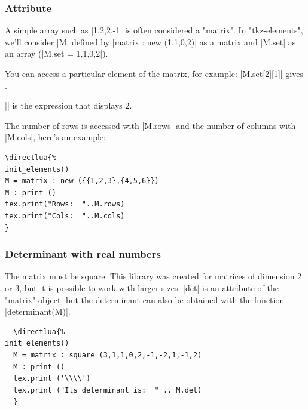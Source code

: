 \subsubsection{Attribute } %
\label{sub:attribute_set}
A simple array such as |{{1,2},{2,-1}}| is often considered a "matrix". In "tkz-elements", we'll consider |M| defined by |matrix : new ({{1,1},{0,2}})| as a matrix and |M.set| as an array (|M.set = {{1,1},{0,2}}|).

You can access a particular element of the matrix, for example: |M.set[2][1]| gives . 

|| is the expression that displays $2$.

The number of rows is accessed with |M.rows| and the number of columns with |M.cols|, here's an example: 

\vspace{.5em}
\begin{minipage}{.5\textwidth}
\begin{Verbatim}
\directlua{%
init_elements()
M = matrix : new ({{1,2,3},{4,5,6}})
M : print ()
tex.print("Rows:  "..M.rows)
tex.print("Cols:  "..M.cols)
}
\end{Verbatim}
\end{minipage}
\begin{minipage}{.5\textwidth}
\end{minipage}

\subsubsection{Determinant with real numbers} %
\label{ssub:determinant_matrix}
The matrix must be square. This library was created for matrices of dimension 2 or 3, but it is possible to work with larger sizes. |det| is an attribute of the "matrix" object, but the determinant can also be obtained with the function |determinant(M)|.

\vspace{.5em}
\begin{minipage}{.6\textwidth}
\begin{Verbatim}
  \directlua{%
init_elements()
  M = matrix : square (3,1,1,0,2,-1,-2,1,-1,2)
  M : print ()
  tex.print ('\\\\')
  tex.print ("Its determinant is:  " .. M.det)
  }
\end{Verbatim}
\end{minipage}
\begin{minipage}{.4\textwidth}
\end{minipage}

